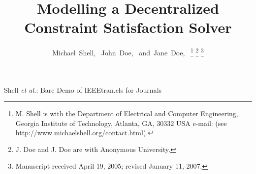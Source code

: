 \documentclass[journal]{IEEEtran}
\begin{document}
%
\title{Modelling a Decentralized Constraint Satisfaction Solver}
%
%
%

\author{Michael~Shell,~
        John~Doe,~
        and~Jane~Doe,~%
\thanks{M. Shell is with the Department
of Electrical and Computer Engineering, Georgia Institute of Technology, Atlanta,
GA, 30332 USA e-mail: (see http://www.michaelshell.org/contact.html).}%
\thanks{J. Doe and J. Doe are with Anonymous University.}%
\thanks{Manuscript received April 19, 2005; revised January 11, 2007.}}

%
%



%
{Shell \MakeLowercase{\textit{et al.}}: Bare Demo of IEEEtran.cls for Journals}
%
\end{document}
